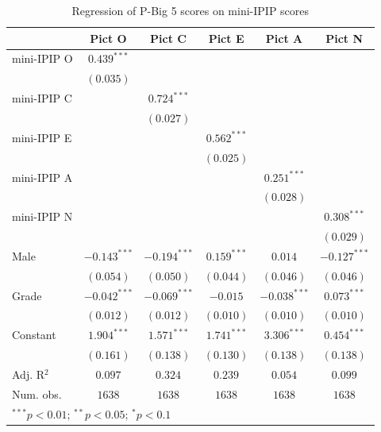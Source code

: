 \begin{table}[htpb]
\small \begin{center}
\begin{tabular}{l c c c c c}
 & Pict O & Pict C & Pict E & Pict A & Pict N \\
\hline
mini-IPIP O & $0.439^{***}$ &  &  &  &  \\
           & $(0.035)$ &  &  &  &  \\
mini-IPIP C &  & $0.724^{***}$ &  &  &  \\
           &  & $(0.027)$ &  &  &  \\
mini-IPIP E &  &  & $0.562^{***}$ &  &  \\
           &  &  & $(0.025)$ &  &  \\
mini-IPIP A &  &  &  & $0.251^{***}$ &  \\
           &  &  &  & $(0.028)$ &  \\
mini-IPIP N &  &  &  &  & $0.308^{***}$ \\
           &  &  &  &  & $(0.029)$ \\
Male & $-0.143^{***}$ & $-0.194^{***}$ & $0.159^{***}$ & $0.014$ & $-0.127^{***}$ \\
           & $(0.054)$ & $(0.050)$ & $(0.044)$ & $(0.046)$ & $(0.046)$ \\
Grade & $-0.042^{***}$ & $-0.069^{***}$ & $-0.015$ & $-0.038^{***}$ & $0.073^{***}$ \\
           & $(0.012)$ & $(0.012)$ & $(0.010)$ & $(0.010)$ & $(0.010)$ \\
Constant & $1.904^{***}$ & $1.571^{***}$ & $1.741^{***}$ & $3.306^{***}$ & $0.454^{***}$ \\
           & $(0.161)$ & $(0.138)$ & $(0.130)$ & $(0.138)$ & $(0.138)$ \\
\hline
Adj. R$^2$ & $0.097$ & $0.324$ & $0.239$ & $0.054$ & $0.099$ \\
Num. obs.  & $1638$ & $1638$ & $1638$ & $1638$ & $1638$ \\
\hline
\multicolumn{6}{l}{\scriptsize{$^{***}p<0.01$; $^{**}p<0.05$; $^{*}p<0.1$}}
\end{tabular}
\caption{\small Regression of P-Big 5 scores on mini-IPIP scores }
\label{table-big5-ipip}
\end{center}
\end{table}
